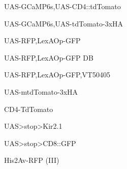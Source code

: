 \documentclass[17pt]{extarticle}
\begin{document}
\footnotesize
\newpage\vspace*{-0.15cm}
\begin{footnotesize}
UAS-GCaMP6s,UAS-CD4::tdTomato \\[0.5em]
\end{footnotesize}
\footnotesize
\newpage\vspace*{-0.15cm}
\begin{footnotesize}
UAS-GCaMP6s,UAS-tdTomato-3xHA \\[0.5em]
\end{footnotesize}
\footnotesize
\newpage\vspace*{-0.15cm}
\begin{footnotesize}
UAS-RFP,LexAOp-GFP \\[0.5em]
\end{footnotesize}
\footnotesize
\newpage\vspace*{-0.15cm}
\begin{footnotesize}
UAS-RFP,LexAOp-GFP DB \\[0.5em]
\end{footnotesize}
\footnotesize
\newpage\vspace*{-0.15cm}
\begin{footnotesize}
UAS-RFP,LexAOp-GFP,VT50405 \\[0.5em]
\end{footnotesize}
\footnotesize
\newpage\vspace*{-0.15cm}
\begin{footnotesize}
UAS-mtdTomato-3xHA \\[0.5em]
\end{footnotesize}
\footnotesize
\newpage\vspace*{-0.15cm}
\begin{normalsize}
CD4-TdTomato \\[0.5em]
\end{normalsize}
\footnotesize
\newpage\vspace*{-0.15cm}
\begin{normalsize}
UAS>stop>Kir2.1 \\[0.5em]
\end{normalsize}
\footnotesize
\newpage\vspace*{-0.15cm}
\begin{footnotesize}
UAS>stop>CD8::GFP \\[0.5em]
\end{footnotesize}
\footnotesize
\newpage\vspace*{-0.15cm}
\begin{footnotesize}
His2Av-RFP (III) \\[0.5em]
\end{footnotesize}
\end{document}
